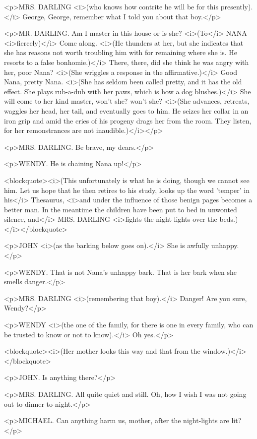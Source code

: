 <p>MRS. DARLING <i>(who knows how contrite he will be for this
presently).</i> George, George, remember what I told you about that
boy.</p>

<p>MR. DARLING. Am I master in this house or is she? <i>(To</i> NANA
<i>fiercely)</i> Come along. <i>(He thunders at her, but she
indicates that she has reasons not worth troubling him with for
remaining where she is. He resorts to a false bonhomie.)</i> There,
there, did she think he was angry with her, poor Nana? <i>(She
wriggles a response in the affirmative.)</i> Good Nana, pretty Nana.
<i>(She has seldom been called pretty, and it has the old effect. She
plays rub-a-dub with her paws, which is how a dog blushes.)</i> She
will come to her kind master, won't she? won't she? <i>(She advances,
retreats, waggles her head, her tail, and eventually goes to him. He
seizes her collar in an iron grip and amid the cries of his progeny
drags her from the room. They listen, for her remonstrances are not
inaudible.)</i></p>

<p>MRS. DARLING. Be brave, my dears.</p>

<p>WENDY. He is chaining Nana up!</p>

<blockquote><i>(This unfortunately is what he is doing, though we
cannot see him. Let us hope that he then retires to his study, looks
up the word 'temper' in his</i> Thesaurus, <i>and under the influence
of those benign pages becomes a better man. In the meantime the
children have been put to bed in unwonted silence, and</i> MRS.
DARLING <i>lights the night-lights over the beds.)</i></blockquote>

<p>JOHN <i>(as the barking below goes on).</i> She is awfully
unhappy.</p>

<p>WENDY. That is not Nana's unhappy bark. That is her bark when she
smells danger.</p>

<p>MRS. DARLING <i>(remembering that boy).</i> Danger! Are you sure,
Wendy?</p>

<p>WENDY <i>(the one of the family, for there is one in every family,
who can be trusted to know or not to know).</i> Oh yes.</p>

<blockquote><i>(Her mother looks this way and that from the
window.)</i></blockquote>

<p>JOHN. Is anything there?</p>

<p>MRS. DARLING. All quite quiet and still. Oh, how I wish I was not
going out to dinner to-night.</p>

<p>MICHAEL. Can anything harm us, mother, after the night-lights are
lit?</p>

